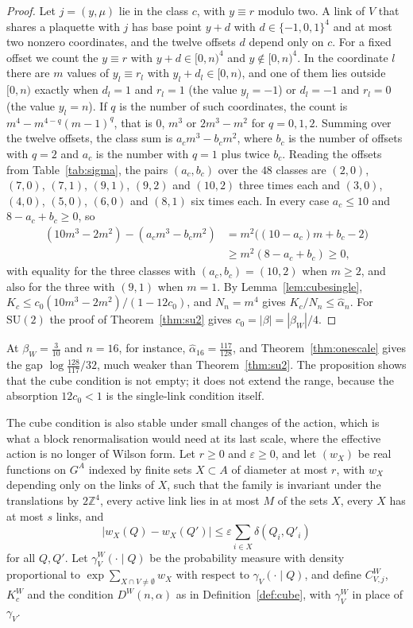 \documentclass[aps,prd,twocolumn,superscriptaddress,nofootinbib,longbibliography,floatfix,amsmath,amssymb,10pt]{revtex4-2}
\theoremstyle{definition}
\theoremstyle{remark}
\newcommand{\Z}{\mathbb{Z}}
\newcommand{\SU}{\mathrm{SU}}
\begin{document}
\begin{proof}
Let $j=(y,\mu)$ lie in the class $c$, with $y\equiv r$ modulo two. A link of
$V$ that shares a plaquette with $j$ has base point $y+d$ with
$d\in\{-1,0,1\}^4$ and at most two nonzero coordinates, and the twelve
offsets $d$ depend only on $c$. For a fixed offset we count the $y\equiv r$
with $y+d\in[0,n)^4$ and $y\notin[0,n)^4$. In the coordinate $l$ there are
$m$ values of $y_l\equiv r_l$ with $y_l+d_l\in[0,n)$, and one of them lies
outside $[0,n)$ exactly when $d_l=1$ and $r_l=1$ (the value $y_l=-1$) or
$d_l=-1$ and $r_l=0$ (the value $y_l=n$). If $q$ is the number of such
coordinates, the count is $m^4-m^{4-q}(m-1)^q$, that is $0$, $m^3$ or
$2m^3-m^2$ for $q=0,1,2$. Summing over the twelve offsets, the class sum is
$a_cm^3-b_cm^2$, where $b_c$ is the number of offsets with $q=2$ and $a_c$ is
the number with $q=1$ plus twice $b_c$. Reading the offsets from
Table~\ref{tab:sigma}, the pairs $(a_c,b_c)$ over the $48$ classes are
$(2,0)$, $(7,0)$, $(7,1)$, $(9,1)$, $(9,2)$ and $(10,2)$ three times each and
$(3,0)$, $(4,0)$, $(5,0)$, $(6,0)$ and $(8,1)$ six times each. In every case
$a_c\le10$ and $8-a_c+b_c\ge0$, so
\[
\begin{split}
(10m^3-2m^2)-(a_cm^3-b_cm^2)&=m^2\bigl((10-a_c)m+b_c-2\bigr)\\
&\ge m^2(8-a_c+b_c)\ge0,
\end{split}
\]
with equality for the three classes with $(a_c,b_c)=(10,2)$ when $m\ge2$, and also for the three with $(9,1)$ when $m=1$. By
Lemma~\ref{lem:cubesingle}, $K_c\le c_0(10m^3-2m^2)/(1-12c_0)$, and $N_n=m^4$
gives $K_c/N_n\le\hat\alpha_n$. For $\SU(2)$ the proof of
Theorem~\ref{thm:su2} gives $c_0=|\beta|=|\beta_W|/4$.
\end{proof}

At $\beta_W=\frac3{10}$ and $n=16$, for instance, $\hat\alpha_{16}=
\frac{117}{128}$, and Theorem~\ref{thm:onescale} gives the gap
$\log\frac{128}{117}/32$, much weaker than Theorem~\ref{thm:su2}. The
proposition shows that the cube condition is not empty; it does not extend
the range, because the absorption $12c_0<1$ is the single-link condition
itself.

The cube condition is also stable under small changes of the action, which
is what a block renormalisation would need at its last scale, where the
effective action is no longer of Wilson form. Let $r\ge0$ and
$\varepsilon\ge0$, and let $(w_X)$ be real functions on $G^A$ indexed by
finite sets $X\subset A$ of diameter at most $r$, with $w_X$ depending only
on the links of $X$, such that the family is invariant under the
translations by $2\Z^4$, every active link lies in at most $M$ of the sets
$X$, every $X$ has at most $s$ links, and
\[
|w_X(Q)-w_X(Q')|\le\varepsilon\sum_{i\in X}\delta(Q_i,Q'_i)
\]
for all $Q,Q'$. Let $\gamma^W_V(\cdot\mid Q)$ be the probability measure
with density proportional to $\exp\sum_{X\cap V\ne\emptyset}w_X$ with respect
to $\gamma_V(\cdot\mid Q)$, and define $C^W_{V,j}$, $K^W_c$ and the condition
$D^W(n,\alpha)$ as in Definition~\ref{def:cube}, with $\gamma^W_V$ in place
of $\gamma_V$.
\end{document}

